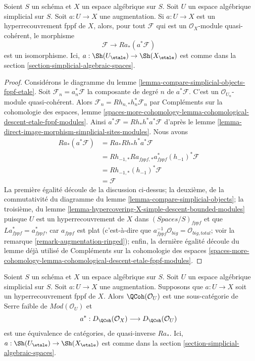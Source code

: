 \begin{lemma}
\label{lemma-cohomological-descent-qcoh-for-fppf-hypercovering}
Soient $S$ un schéma et $X$ un espace algébrique sur $S$.
Soit $U$ un espace algébrique simplicial sur $S$. Soit $a : U \to X$
une augmentation. Si $a : U \to X$ est un hyperrecouvrement fppf de $X$,
alors, pour tout $\mathcal{F}$ qui est un $\mathcal{O}_X$-module quasi-cohérent,
le morphisme
$$
\mathcal{F} \to Ra_*(a^*\mathcal{F})
$$
est un isomorphisme. Ici, $a : \Sh(U_\etale) \to \Sh(X_\etale)$
est comme dans la section \ref{section-simplicial-algebraic-spaces}.
\end{lemma}

\begin{proof}
Considérons le diagramme du lemme \ref{lemma-compare-simplicial-objects-fppf-etale}.
Soit $\mathcal{F}_n = a_n^*\mathcal{F}$ la composante de degré $n$ de
$a^*\mathcal{F}$. C'est un $\mathcal{O}_{U_n}$-module quasi-cohérent.
Alors $\mathcal{F}_n = Rh_{n, *}h_n^*\mathcal{F}_n$
par Compléments sur la cohomologie des espaces, lemme
\ref{spaces-more-cohomology-lemma-cohomological-descent-etale-fppf-modules}.
Ainsi $a^*\mathcal{F} = Rh_*h^*a^*\mathcal{F}$ d'après le
lemme \ref{lemma-direct-image-morphism-simplicial-sites-modules}.
Nous avons
\begin{align*}
Ra_*(a^*\mathcal{F})
& =
Ra_*Rh_*h^*a^*\mathcal{F} \\
& =
Rh_{-1, *}Ra_{fppf, *}a_{fppf}^*(h_{-1})^*\mathcal{F} \\
& =
Rh_{-1, *}(h_{-1})^*\mathcal{F} \\
& =
\mathcal{F}
\end{align*}
La première égalité découle de la discussion ci-dessus; la deuxième,
de la commutativité du diagramme du lemme
\ref{lemma-compare-simplicial-objects}; la troisième, du lemme
\ref{lemma-hypercovering-X-simple-descent-bounded-modules}
puisque $U$ est un hyperrecouvrement de $X$ dans $(\textit{Spaces}/S)_{fppf}$
et que $La_{fppf}^* = a_{fppf}^*$, car $a_{fppf}$ est plat
(c'est-à-dire que $a_{fppf}^{-1}\mathcal{O}_{big} = \mathcal{O}_{big, total}$;
voir la remarque \ref{remark-augmentation-ringed}); enfin,
la dernière égalité découle du lemme déjà utilisé de
Compléments sur la cohomologie des espaces
\ref{spaces-more-cohomology-lemma-cohomological-descent-etale-fppf-modules}.
\end{proof}

\begin{lemma}
\label{lemma-coh-descent-qcoh-unbounded-for-fppf-hypercovering}
Soient $S$ un schéma et $X$ un espace algébrique sur $S$.
Soit $U$ un espace algébrique simplicial sur $S$. Soit $a : U \to X$
une augmentation. Supposons que $a : U \to X$ soit un hyperrecouvrement fppf de $X$.
Alors $\QCoh(\mathcal{O}_U)$ est une sous-catégorie de Serre faible de
$\textit{Mod}(\mathcal{O}_U)$ et
$$
a^* : D_\QCoh(\mathcal{O}_X) \longrightarrow D_\QCoh(\mathcal{O}_U)
$$
est une équivalence de catégories, de quasi-inverse
$Ra_*$. Ici, $a : \Sh(U_\etale) \to \Sh(X_\etale)$
est comme dans la section \ref{section-simplicial-algebraic-spaces}.
\end{lemma}

